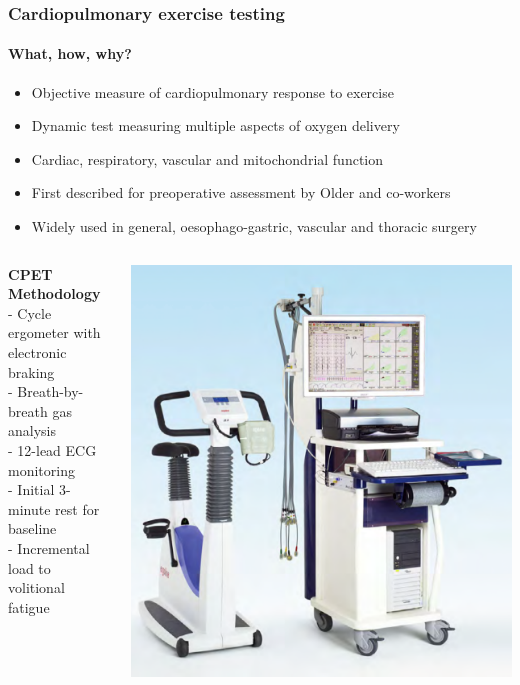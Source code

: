 \documentclass[10pt]{beamer}
\begin{document}
\begin{frame}
	\frametitle{Cardiopulmonary exercise testing}
	\framesubtitle{What, how, why?}
	{\footnotesize
	\begin{itemize}
		\item Objective measure of cardiopulmonary response to exercise
		\item Dynamic test measuring multiple aspects of oxygen delivery
		\item Cardiac, respiratory, vascular and mitochondrial function
		\item First described for preoperative assessment by Older and co-workers
		\item Widely used in general, oesophago-gastric, vascular and thoracic surgery
	\end{itemize}
	\vfill

	\begin{columns}
			\textbf{CPET Methodology}
			\\ - Cycle ergometer with electronic braking
			\\ - Breath-by-breath gas analysis
			\\ - 12-lead ECG monitoring
			\\ - Initial 3-minute rest for baseline
			\\ - Incremental load to volitional fatigue
				

			\includegraphics[height=0.4\textheight]{../Figures/cpet-zan}


		
	\end{columns}
	}
\end{frame}
\end{document}
